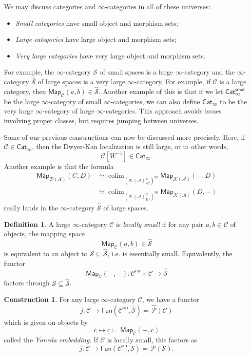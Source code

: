 \documentclass[10pt, oneside]{memoir}
\theoremstyle{definition}
\newtheorem{defn}[thm]{Definition}
\newtheorem{con}[thm]{Construction}
\theoremstyle{remark}
\theoremstyle{plain}
\theoremstyle{definition}
\theoremstyle{remark}
\newcommand{\mc}[1]{\mathcal{#1}}
\newcommand{\ms}[1]{\mathsf{#1}}
\newcommand{\ul}[1]{\underline{#1}}
\newcommand{\1}{\mathbf{1}}
\newcommand{\2}{\mathbf{2}}
\newcommand{\3}{\mathbf{3}}
\DeclareMathOperator{\op}{op}
\DeclareMathOperator*{\colim}{colim}
\begin{document}
We may discuss categories and $\infty$-categories in all of these universes:
\begin{itemize}
    \item \textit{Small categories} have small object and morphism sets;
    \item \textit{Large categories} have large object and morphism sets;
    \item \textit{Very large categories} have very large object and morphism sets.
\end{itemize}
For example, the $\infty$-category $\mc{S}$ of small spaces is a large $\infty$-category and the $\infty$-category $\hat{\mc{S}}$ of large spaces is a very large $\infty$-category. For example, if $\mc{C}$ is a large category, then $\ms{Map}_{\mc{C}}(a,b) \in \hat{\mc{S}}$. Another example of this is that if we let $\ms{Cat}_{\infty}^{\ms{small}}$ be the large $\infty$-category of small $\infty$-categories, we can also define $\ms{Cat}_{\infty}$ to be the very large $\infty$-category of large $\infty$-categories. This approach avoids issues involving proper classes, but requires jumping between universes.

Some of our previous constructions can now be discussed more precisely. Here, if $\mc{C} \in \ms{Cat}_{\infty}$, then the Dwyer-Kan localization is still large, or in other words,
\[ \mc{C}[W^{-1}] \in \ms{Cat}_{\infty}. \]
Another example is that the formula
\begin{align*}
    \ms{Map}_{\mc{D}(\mc{A})}(C, D) &\simeq \colim_{(\mc{K}(\mc{A})_{/C}^{\ms{qi}})^{\op}} \ms{Map}_{\mc{K}(\mc{A})}(-, D) \\
    &\simeq \colim_{(\mc{K}(\mc{A})_{D/}^{\ms{qi}})^{\op}} \ms{Map}_{\mc{K}(\mc{A})}(D, -)
\end{align*}
really lands in the $\infty$-category $\hat{\mc{S}}$ of large spaces.

\begin{defn}
    A large $\infty$-category $\mc{C}$ is \textit{locally small} if for any pair $a,b \in \mc{C}$ of objects, the mapping space
    \[ \ms{Map}_{\mc{C}}(a,b) \in \hat{\mc{S}} \]
    is equivalent to an object to $\mc{S} \subseteq \hat{\mc{S}}$, i.e. is essentially small. Equivalently, the functor
    \[ \ms{Map}_{\mc{C}}(-,-) \colon \mc{C}^{\op} \times \mc{C} \to \hat{\mc{S}} \]
    factors through $\mc{S} \subseteq \hat{\mc{S}}$.
\end{defn}

\begin{con}
    For any large $\infty$-category $\mc{C}$, we have a functor
    \[ j \colon \mc{C} \to \ms{Fun}(\mc{C}^{\op}, \hat{\mc{S}}) \eqqcolon \hat{\mc{P}}(\mc{C}) \]
    which is given on objects by
    \[ c \mapsto \ul{c} \coloneqq \ms{Map}_{\mc{C}}(-, c) \]
    called the \textit{Yoneda embedding}. If $\mc{C}$ is locally small, this factors as
    \[ j \colon \mc{C} \to \ms{Fun}(\mc{C}^{\op}, \mc{S}) \eqqcolon \mc{P}(\mc{S}). \]
\end{con}
\end{document}
